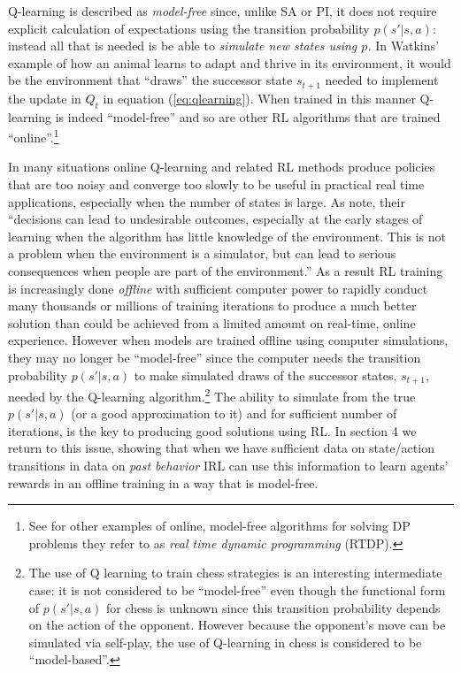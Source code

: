 Q-learning  is described as {\it model-free\/} since, unlike SA or PI, it does not require explicit calculation of expectations using the
transition probability $p(s'|s,a)$: instead all that is needed is be able to {\it simulate new states using $p$.\/} In  Watkins'  example 
of how an animal learns to adapt and thrive in its environment, it would be the environment that ``draws'' the successor state
$s_{t+1}$ needed to implement the update in $Q_t$ in equation (\ref{eq:qlearning}). When trained in this manner Q-learning is indeed ``model-free'' 
and so are other RL algorithms that are trained ``online''.\footnote{\footnotesize See \citet{Barto:1995} for other
examples of online, model-free algorithms for solving DP problems they refer to as  {\it real time dynamic programming\/} (RTDP).}

In many situations online Q-learning and related RL methods produce policies that 
are too noisy and converge too slowly to be useful in practical 
real time applications, especially when the number of states is large.  As \citet{JiangXie:2024} note, their 
``decisions can lead to undesirable outcomes, especially at the early stages of learning when the algorithm has little knowledge of the environment. This is not a problem when the environment is a simulator, but can lead to serious consequences when people are part of the environment.''
As a result RL training is increasingly done {\it offline\/} with
sufficient computer power to rapidly conduct many thousands or millions of training iterations to produce a much better solution than could be achieved
from a limited amount on real-time, online experience.  However when models are trained offline using computer simulations, 
they may no longer be  ``model-free'' since the computer needs 
the transition probability  $p(s'|s,a)$ to make simulated draws of the
successor states, $s_{t+1}$, needed by the Q-learning algorithm.\footnote{\footnotesize The use of Q learning
to train chess strategies is an interesting intermediate case: it is not considered to be
``model-free'' even though the functional form of $p(s'|s,a)$ for chess is unknown since
this transition probability depends on the action of the opponent. However because the opponent's
move can be simulated via self-play, the use of Q-learning in chess is considered to be
``model-based''.}  The ability to simulate from the true $p(s'|s,a)$  (or a good approximation to it)
and for sufficient number of iterations, is  the key to producing good solutions using RL.
In section 4 we return to this issue, showing that when we have sufficient data on state/action transitions in
data on {\it past behavior\/} IRL can use this information to learn agents' rewards in an offline
training in a way that is model-free.

